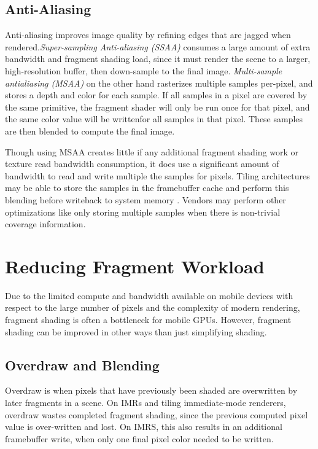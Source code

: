 \subsection{Anti-Aliasing}
 Anti-aliasing improves image quality by refining edges
that are jagged when rendered.\textit{Super-sampling Anti-aliasing (SSAA)}
consumes a large amount of extra bandwidth and fragment shading load, since it
must render the scene to a larger, high-resolution buffer, then down-sample to
the final image.  \textit{Multi-sample antialiasing (MSAA)} on the other hand
rasterizes multiple samples per-pixel, and stores a depth and color for each
sample.  If all samples in a pixel are covered by the same primitive, the
fragment shader will only be run once for that pixel, and the same color value
will be writtenfor all samples in that pixel.  These samples are then blended
to compute the final image. \cite{aths03}

Though using MSAA creates little if any additional fragment shading work or
texture read bandwidth consumption, it does use a significant amount of
bandwidth to read and write multiple the samples for pixels.  Tiling
architectures may be able to store the samples in the framebuffer cache and
perform this blending before writeback to system memory \cite{POWERVR11}.
Vendors may perform other optimizations like only storing multiple samples when
there is non-trivial coverage information.
\section{Reducing Fragment Workload}
\label{Jon-McCaffrey-Reducing-Fragment-Workload}


Due to the limited compute and bandwidth available on mobile devices with
respect to the large number of pixels and the complexity of modern rendering,
fragment shading is often a bottleneck for mobile GPUs.  However, fragment
shading can be improved in other ways than just simplifying shading.

\subsection{Overdraw and Blending}\label{Jon-McCaffrey-Overdraw-And-Blending}
Overdraw is when pixels that have previously been shaded are overwritten by
later fragments in a scene.  On IMRs and tiling immediate-mode renderers,
overdraw wastes completed fragment
 shading, since the previous computed pixel
value is over-written and lost.
 On IMRS, this also results in an additional
framebuffer write, when only one final pixel
 color needed to be written.

